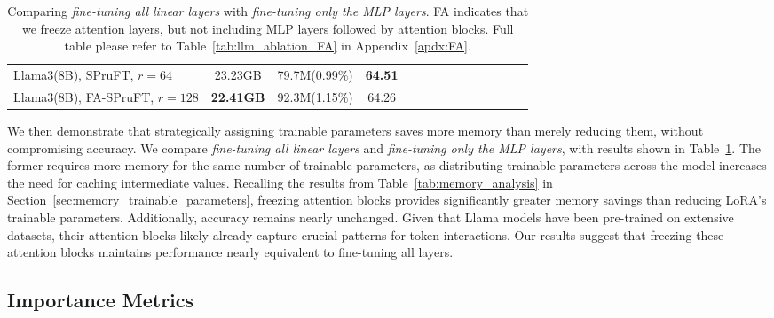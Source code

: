 \begin{table}[htbp]
\begin{center}
\begin{tabular}{lccccccccccccc}
Llama3(8B), SPruFT, $r=64$ & 23.23GB & 79.7M(0.99\%) & \textbf{64.51} \\
Llama3(8B), FA-SPruFT, $r=128$ & \textbf{22.41GB} & 92.3M(1.15\%) & 64.26 \\\bottomrule
\end{tabular}
\caption{ Comparing \emph{fine-tuning all linear layers} with \emph{fine-tuning only the MLP layers}. FA indicates that we freeze attention layers, but not including MLP layers followed by attention blocks. Full table please refer to Table~\ref{tab:llm_ablation_FA} in Appendix~\ref{apdx:FA}. } \label{tab:llm_FA} 
\end{center}
\end{table}

We then demonstrate that strategically assigning trainable parameters saves more memory than merely reducing them, without compromising accuracy. We compare \emph{fine-tuning all linear layers} and \emph{fine-tuning only the MLP layers}, with results shown in Table~\ref{tab:llm_FA}. The former requires more memory for the same number of trainable parameters, as distributing trainable parameters across the model increases the need for caching intermediate values. Recalling the results from Table~\ref{tab:memory_analysis} in Section~\ref{sec:memory_trainable_parameters}, freezing attention blocks provides significantly greater memory savings than reducing LoRA's trainable parameters. Additionally, accuracy remains nearly unchanged. Given that Llama models have been pre-trained on extensive datasets, their attention blocks likely already capture crucial patterns for token interactions. Our results suggest that freezing these attention blocks maintains performance nearly equivalent to fine-tuning all layers.

\subsection{Importance Metrics} \label{subsec:results_dep}

